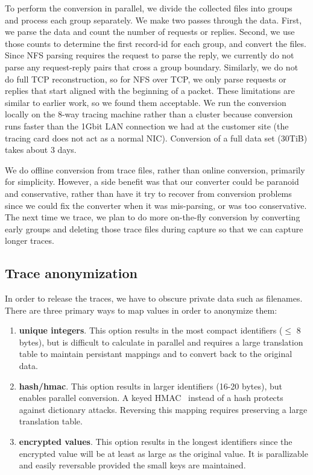 To perform the conversion in parallel, we divide the collected files
into groups and process each group separately.  We make two passes
through the data.  First, we parse the data and count the number of
requests or replies.  Second, we use those counts to determine the
first record-id for each group, and convert the files.  Since NFS
parsing requires the request to parse the reply, we currently do not
parse any request-reply pairs that cross a group boundary.  Similarly,
we do not do full TCP reconstruction, so for NFS over TCP, we only
parse requests or replies that start aligned with the beginning of a
packet. These limitations are similar to earlier work, so we found
them acceptable.   We run the conversion locally on the 8-way tracing
machine rather than a cluster because conversion runs faster than the
1Gbit LAN connection we had at the customer site (the tracing card
does not act as a normal NIC).  Conversion of a full data set (30TiB)
takes about 3 days.

We do offline conversion from trace files, rather than online conversion, primarily for simplicity.
However, a side benefit was that our converter could be
paranoid and conservative, rather than have it try to recover from
conversion problems since we could fix the converter when it was
mis-parsing, or was too conservative.  The next time we trace, we plan
to do more on-the-fly conversion by converting early groups and
deleting those trace files during capture so that we can capture
longer traces.

\subsection{Trace anonymization}

In order to release the traces, we have to obscure private data such
as filenames.  There are three primary ways to map values in order to
anonymize them:

\begin{enumerate}

\item {\bf unique integers}.  This option results in the
most compact identifiers ($\leq$ 8 bytes), but is difficult to
calculate in parallel and requires a large translation table to
maintain persistant mappings and to convert back to the original data.

\item {\bf hash/hmac}.  This option results in larger identifiers
(16-20 bytes), but enables parallel conversion.  A keyed
HMAC~\cite{Bellare96keyinghash} instead of a hash protects against
dictionary attacks.  Reversing this mapping requires preserving a
large translation table.

\item {\bf encrypted values}.  This option results in
the longest identifiers since the encrypted value will be at least as
large as the original value.  It is parallizable and easily reversable
provided the small keys are maintained.

\end{enumerate}

